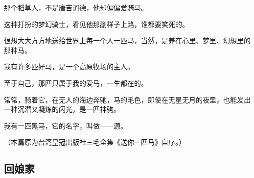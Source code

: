 \par 那个稻草人，不是唐吉诃德，他却偏偏爱骑马。
\par 这种打扮的梦幻骑士，看见他那副样子上路，谁都要笑死的。
\par 很想大大方方地送给世界上每一个人一匹马，当然，是养在心里、梦里、幻想里的那种马。
\par 我有许多匹好马，是一个高原牧场的主人。
\par 至于自己，那匹只属于我的爱马，一生都在的。
\par 常常，骑着它，在无人的海边奔驰，马的毛色，即使在无星无月的夜里，也能发出一种沉潜又凝炼的闪光，是一匹神驹。
\par 我有一匹黑马，它的名字，叫做——源。
\par （本篇原为台湾皇冠出版社三毛全集《送你一匹马》自序。）


\subsection{回娘家}

